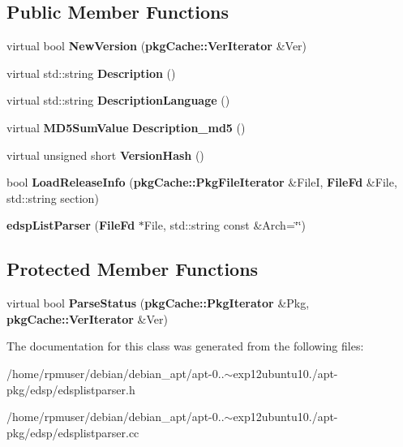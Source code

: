 \subsection*{\-Public \-Member \-Functions}
\begin{DoxyCompactItemize}
\item 
virtual bool {\bfseries \-New\-Version} ({\bf pkg\-Cache\-::\-Ver\-Iterator} \&\-Ver)\label{classedspListParser_ab0739a9acf5509c3381d49350f6c4cc0}

\item 
virtual std\-::string {\bfseries \-Description} ()\label{classedspListParser_a36dad231a3b906d97848a420bb61d8f4}

\item 
virtual std\-::string {\bfseries \-Description\-Language} ()\label{classedspListParser_ae3d7cf766ece0343b77c137a44014bb3}

\item 
virtual {\bf \-M\-D5\-Sum\-Value} {\bfseries \-Description\-\_\-md5} ()\label{classedspListParser_af6e909cae5e99d04567e77aade983b66}

\item 
virtual unsigned short {\bfseries \-Version\-Hash} ()\label{classedspListParser_a1817727f21ff86bb623fd169cd4bcee0}

\item 
bool {\bfseries \-Load\-Release\-Info} ({\bf pkg\-Cache\-::\-Pkg\-File\-Iterator} \&\-File\-I, {\bf \-File\-Fd} \&\-File, std\-::string section)\label{classedspListParser_a045594301522e29d4764ab65e214b727}

\item 
{\bfseries edsp\-List\-Parser} ({\bf \-File\-Fd} $\ast$\-File, std\-::string const \&\-Arch=\char`\"{}\char`\"{})\label{classedspListParser_aa3fb5c430287580927ed755061a3a3f3}

\end{DoxyCompactItemize}
\subsection*{\-Protected \-Member \-Functions}
\begin{DoxyCompactItemize}
\item 
virtual bool {\bfseries \-Parse\-Status} ({\bf pkg\-Cache\-::\-Pkg\-Iterator} \&\-Pkg, {\bf pkg\-Cache\-::\-Ver\-Iterator} \&\-Ver)\label{classedspListParser_a0086e995b5bccf24c99c487d5081f3f2}

\end{DoxyCompactItemize}


\-The documentation for this class was generated from the following files\-:\begin{DoxyCompactItemize}
\item 
/home/rpmuser/debian/debian\-\_\-apt/apt-\/0..$\sim$exp12ubuntu10./apt-\/pkg/edsp/edsplistparser.\-h\item 
/home/rpmuser/debian/debian\-\_\-apt/apt-\/0..$\sim$exp12ubuntu10./apt-\/pkg/edsp/edsplistparser.\-cc\end{DoxyCompactItemize}
